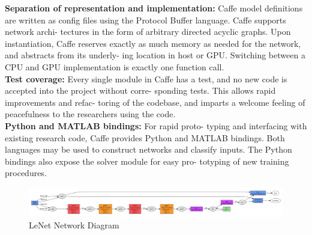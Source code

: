  \textbf{Separation of representation and implementation:} Caffe model definitions are written as config files using the Protocol Buffer language. Caffe supports network archi- tectures in the form of arbitrary directed acyclic graphs. Upon instantiation, Caffe reserves exactly as much memory as needed for the network, and abstracts from its underly- ing location in host or GPU. Switching between a CPU and GPU implementation is exactly one function call. \\

\textbf{Test coverage:} Every single module in Caffe has a test, and no new code is accepted into the project without corre- sponding tests. This allows rapid improvements and refac- toring of the codebase, and imparts a welcome feeling of peacefulness to the researchers using the code. \\

\textbf{Python and MATLAB bindings:} For rapid proto- typing and interfacing with existing research code, Caffe provides Python and MATLAB bindings. Both languages may be used to construct networks and classify inputs. The Python bindings also expose the solver module for easy pro- totyping of new training procedures.

\begin{figure}[t]
	\begin{center}
		\includegraphics[width=\textwidth]{Figures/Figure18}
	\end{center}
	\caption{LeNet Network Diagram}
	\label{fig:Figure18}
\end{figure}
